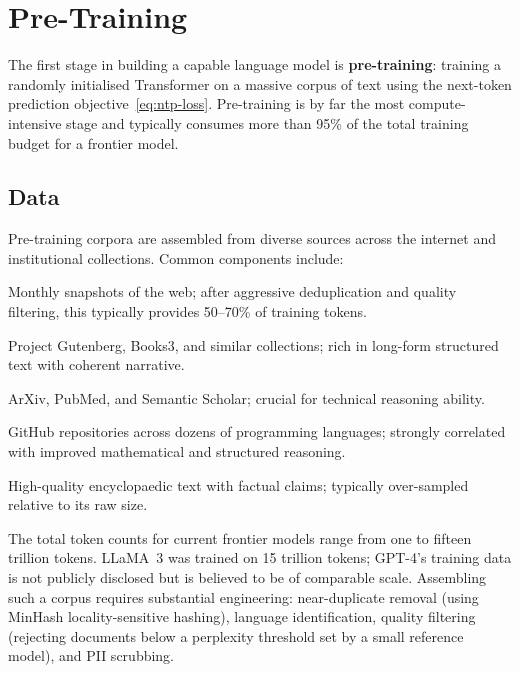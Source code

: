 \section{Pre-Training}
\label{sec:pretraining}

The first stage in building a capable language model is \textbf{pre-training}: training a randomly initialised Transformer on a massive corpus of text using the next-token prediction objective~\eqref{eq:ntp-loss}. Pre-training is by far the most compute-intensive stage and typically consumes more than 95\% of the total training budget for a frontier model.

\subsection{Data}

Pre-training corpora are assembled from diverse sources across the internet and institutional collections. Common components include:

\begin{description}[leftmargin=!, labelwidth=3.5cm]
  \item[Common Crawl] Monthly snapshots of the web; after aggressive deduplication and quality filtering, this typically provides 50--70\% of training tokens.
  \item[Books] Project Gutenberg, Books3, and similar collections; rich in long-form structured text with coherent narrative.
  \item[Scientific literature] ArXiv, PubMed, and Semantic Scholar; crucial for technical reasoning ability.
  \item[Code] GitHub repositories across dozens of programming languages; strongly correlated with improved mathematical and structured reasoning.
  \item[Wikipedia and Wikidata] High-quality encyclopaedic text with factual claims; typically over-sampled relative to its raw size.
\end{description}

The total token counts for current frontier models range from one to fifteen trillion tokens. LLaMA~3 was trained on 15 trillion tokens; GPT-4's training data is not publicly disclosed but is believed to be of comparable scale. Assembling such a corpus requires substantial engineering: near-duplicate removal (using MinHash locality-sensitive hashing), language identification, quality filtering (rejecting documents below a perplexity threshold set by a small reference model), and PII scrubbing.

